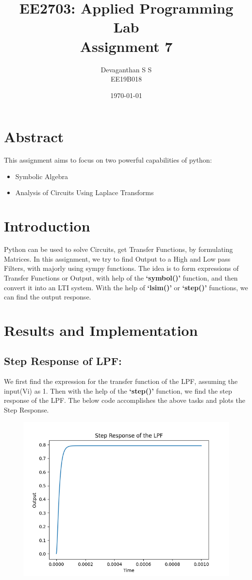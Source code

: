 \documentclass[12pt, a4paper]{report}
\title{\textbf{EE2703: Applied Programming Lab\\Assignment 7\\
}}
\author{Devaganthan S S\\ EE19B018}
\date{\today}
\begin{document}
\maketitle


\section{Abstract}
This assignment aims to focus on two powerful capabilities of python:
\begin{itemize}
  \item Symbolic Algebra
  \item Analysis of Circuits Using Laplace Transforms
\end{itemize}

\section{Introduction}
Python can be used to solve Circuits, get Transfer Functions, by formulating Matrices. In this assignment, we try to find Output to a High and Low pass Filters, with majorly using sympy functions. The idea is to form expressions of Transfer Functions or Output, with help of the \textbf{‘symbol()’}  function, and then convert it into an LTI system. With the help of \textbf{‘lsim()’} or \textbf{‘step()’} functions, we can find the output response.
\section{Results and Implementation}
\subsection{Step Response of LPF:}
We first find the expression for the transfer function of the LPF, assuming the input(Vi) as 1. Then with the help of the \textbf{‘step()’} function, we find the step response of the LPF. The below code accomplishes the above tasks and plots the Step Response.
\noindent

\begin{figure}[h!]
    \centering
    \includegraphics[scale=0.75]{fig1.png} 
    \caption{}
    \label{fig:my_label}
\end{figure}
\vspace{100mm}
\end{document}
